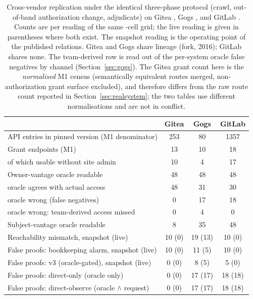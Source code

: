 \begin{table}[t]
\centering
\small
\caption{Cross-vendor replication under the identical three-phase protocol
(crawl, out-of-band authorization change, adjudicate) on Gitea
\ResRsVersion{}, Gogs \GgVersion{}, and GitLab \GlVersion{}. Counts are per
reading of the same \ResRsCellsSnapshot{}-cell grid; the live reading is
given in parentheses where both exist. The snapshot reading is the operating
point of the published relations. Gitea and Gogs share lineage
(fork, 2016); GitLab shares none. The team-derived row is read out of the
per-system oracle false negatives by channel (Section~\ref{sec:gogs}). The
Gitea grant count here is the \emph{normalised} M1 census (semantically
equivalent routes merged, non-authorization grant surface excluded), and
therefore differs from the raw route count reported in Section~\ref{sec:realsystem}; the two
tables use different normalisations and are not in conflict.}
\label{tab:gogs-cross}
\begin{tabular}{@{}lccc@{}}
\toprule
 & Gitea \ResRsVersion{} & Gogs \GgVersion{} & GitLab \GlVersion{} \\
\midrule
API entries in pinned version (M1 denominator) & 253 & 80 & 1357 \\
Grant endpoints (M1) & 13 & 10 & 18 \\
\;of which usable without site admin & 10 & 4 & 17 \\
Owner-vantage oracle readable & 48 & 48 & 48 \\
\;oracle agrees with actual access & 48 & 31 & 30 \\
\;oracle wrong (false negatives) & 0 & 17 & 18 \\
\;oracle wrong: team-derived access missed & 0 & 4 & 0 \\
Subject-vantage oracle readable & 8 & 35 & 48 \\
Reachability mismatch, snapshot (live) & 10 (0) & 19 (13) & 10 (0) \\
False proofs: bookkeeping alarm, snapshot (live) & 10 (0) & 11 (5) & 10 (0) \\
False proofs: v3 (oracle-gated), snapshot (live) & 0 (0) & 8 (5) & 5 (0) \\
False proofs: direct-only (oracle only) & 0 (0) & 17 (17) & 18 (18) \\
False proofs: direct-observe (oracle $\wedge$ request) & 0 (0) & 17 (17) & 18 (18) \\
\bottomrule
\end{tabular}
\end{table}
